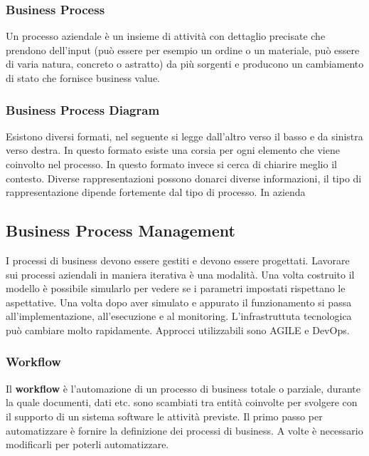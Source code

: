 \subsubsection{Business Process}
Un processo aziendale è un insieme di attività con dettaglio precisate che prendono dell'input (può essere per esempio un ordine o un materiale, può essere di varia natura, concreto o astratto) da più sorgenti e producono un cambiamento di stato che fornisce business value.
\subsubsection{Business Process Diagram}
Esistono diversi formati, nel seguente si legge dall'altro verso il basso e da sinistra verso destra.
In questo formato esiste una corsia per ogni elemento che viene coinvolto nel processo.
In questo formato invece si cerca di chiarire meglio il contesto.
Diverse rappresentazioni possono donarci diverse informazioni, il tipo di rappresentazione dipende fortemente dal tipo di processo. In azienda
\subsection{Business Process Management}
I processi di business devono essere gestiti e devono essere progettati. Lavorare sui processi aziendali in maniera iterativa è una modalità. Una volta costruito il modello è possibile simularlo per vedere se i parametri impostati rispettano le aspettative. Una volta dopo aver simulato e appurato il funzionamento si passa all'implementazione, all'esecuzione e al monitoring. L'infrastruttuta tecnologica può cambiare molto rapidamente. Approcci utilizzabili sono AGILE e DevOps.

\subsubsection{Workflow}
Il \textbf{workflow} è l'automazione di un processo di business totale o parziale, durante la quale documenti, dati etc. sono scambiati tra entità coinvolte per svolgere con il supporto di un sistema software le attività previste.\newline
Il primo passo per automatizzare è fornire la definizione dei processi di business. A volte è necessario modificarli per poterli automatizzare.

